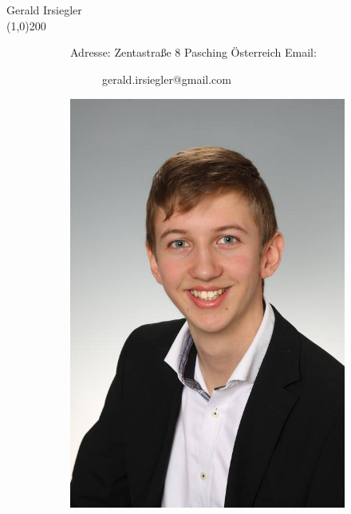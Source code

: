 \documentclass[FIPLY_base.tex]{subfiles}
\begin{document}
	\ \\
	\ \\
	{\Large Gerald Irsiegler}
	\ \\
	\line(1,0){200}
	\begin{figure}[H]
		\begin{subfigure}[b]{0.3\textwidth}
			Adresse: \newline
			Zentastraße 8  Pasching \newline
			Österreich \newline
			\newline
			Email:
			\begin{subfigure}[b]{0.2\textwidth}
				gerald.irsiegler@gmail.com
			\end{subfigure}
		\end{subfigure}
		\hfil
		\begin{subfigure}[b]{0.2\textwidth}
			\includegraphics[scale=0.1]{img/gary}
		\end{subfigure}
	\end{figure}
\end{document}
